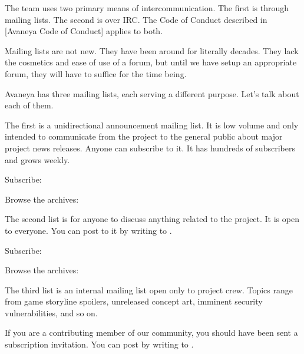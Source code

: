 
The team uses two primary means of intercommunication. The first is through mailing lists. The second is over IRC. The Code of Conduct described in [Avaneya Code of Conduct] applies to both.

Mailing lists are not new. They have been around for literally decades. They lack the cosmetics and ease of use of a forum, but until we have setup an appropriate forum, they will have to suffice for the time being. 

Avaneya has three mailing lists, each serving a different purpose. Let's talk about each of them.

The first is a unidirectional announcement mailing list. It is low volume and only intended to communicate from the project to the general public about major project news releases. Anyone can subscribe to it. It has hundreds of subscribers and grows weekly.

\blank[2*big]
\startnarrower[3*left]
Subscribe:\crlf
{} 

\blank[2*big]
Browse the archives:\crlf
{}
\stopnarrower
\crlf

The second list is for anyone to discuss anything related to the project. It is open to everyone. You can post to it by writing to .

\blank[2*big]
\startnarrower[3*left]
Subscribe:\crlf
{} 

\blank[2*big]
Browse the archives:\crlf
{}
\stopnarrower
\crlf

The third list is an internal mailing list open only to project crew. Topics range from game storyline spoilers, unreleased concept art, imminent security vulnerabilities, and so on. 

If you are a contributing member of our community, you should have been sent a subscription invitation. You can post by writing to .

